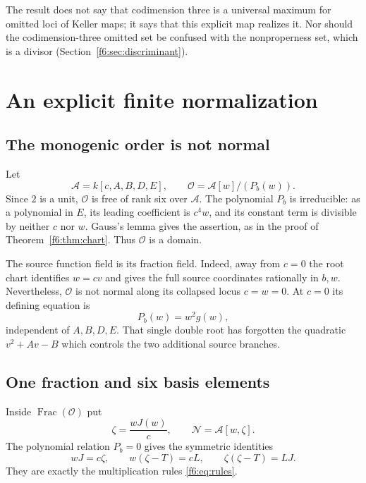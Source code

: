\documentclass[11pt,a4paper]{article}
\theoremstyle{definition}
\newcommand{\base}{\mathcal A}
\newcommand{\normal}{\mathcal N}
\newcommand{\ord}{\mathcal O}
\begin{document}
The result does not say that codimension three is a universal maximum for
omitted loci of Keller maps; it says that this explicit map realizes it. Nor
should the codimension-three omitted set be confused with the nonproperness
set, which is a divisor (Section~\ref{f6:sec:discriminant}).

\section{An explicit finite normalization}
\label{f6:sec:normalization}

\subsection{The monogenic order is not normal}
Let
\[
 \base=k[c,A,B,D,E],\qquad
 \ord=\base[w]/(P_b(w)).
\]
Since $2$ is a unit, $\ord$ is free of rank six over $\base$.
The polynomial $P_b$ is irreducible: as a polynomial in $E$, its leading
coefficient is $c^4w$, and its constant term is divisible by neither $c$
nor $w$. Gauss's lemma gives the assertion, as in the proof of
Theorem~\ref{f6:thm:chart}. Thus $\ord$ is a domain.

The source function field is its fraction field. Indeed, away from $c=0$
the root chart identifies $w=cv$ and gives the full source coordinates
rationally in $b,w$. Nevertheless, $\ord$ is not normal along its
collapsed locus $c=w=0$. At $c=0$ its defining equation is
\[
 P_b(w)=w^2g(w),
\]
independent of $A,B,D,E$. That single double root has forgotten the
quadratic $v^2+Av-B$ which controls the two additional source branches.

\subsection{One fraction and six basis elements}
Inside $\operatorname{Frac}(\ord)$ put
\begin{equation}\label{f6:eq:zeta}
 \zeta=\frac{wJ(w)}{c},\qquad \normal=\base[w,\zeta].
\end{equation}
The polynomial relation $P_b=0$ gives the symmetric identities
\begin{equation}\label{f6:eq:rankone}
 wJ=c\zeta,\qquad w(\zeta-T)=cL,\qquad
 \zeta(\zeta-T)=LJ.
\end{equation}
They are exactly the multiplication rules \eqref{f6:eq:rules}.
\end{document}
